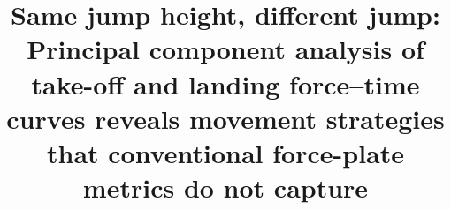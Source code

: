 \title{Same jump height, different jump: Principal component analysis of take-off and landing force--time curves reveals movement strategies that conventional force-plate metrics do not capture}
